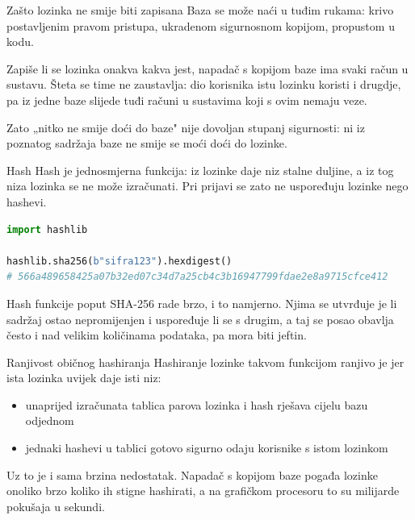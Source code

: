 
\begin{frame}{Zašto lozinka ne smije biti zapisana}
Baza se može naći u tuđim rukama: krivo postavljenim pravom pristupa, ukradenom sigurnosnom kopijom, propustom u kodu.

\vspace{1.1em}
Zapiše li se lozinka onakva kakva jest, napadač s kopijom baze ima svaki račun u sustavu. Šteta se time ne zaustavlja: dio korisnika istu lozinku koristi i drugdje, pa iz jedne baze slijede tuđi računi u sustavima koji s ovim nemaju veze.

\vspace{1.1em}
Zato „nitko ne smije doći do baze" nije dovoljan stupanj sigurnosti: ni iz poznatog sadržaja baze ne smije se moći doći do lozinke.
\end{frame}

\begin{frame}[fragile]{Hash}
Hash je jednosmjerna funkcija: iz lozinke daje niz stalne duljine, a iz tog niza lozinka se ne može izračunati. Pri prijavi se zato ne uspoređuju lozinke nego hashevi.

\begin{lstlisting}[language=python]
import hashlib

hashlib.sha256(b"sifra123").hexdigest()
# 566a489658425a07b32ed07c34d7a25cb4c3b16947799fdae2e8a9715cfce412
\end{lstlisting}

\vspace{1.1em}
Hash funkcije poput SHA-256 rade brzo, i to namjerno. Njima se utvrđuje je li sadržaj ostao nepromijenjen i uspoređuje li se s drugim, a taj se posao obavlja često i nad velikim količinama podataka, pa mora biti jeftin.
\end{frame}


\begin{frame}{Ranjivost običnog hashiranja}
Hashiranje lozinke takvom funkcijom ranjivo je jer ista lozinka uvijek daje isti niz:

\vspace{0.5em}
\begin{itemize}
  \item unaprijed izračunata tablica parova lozinka i hash rješava cijelu bazu odjednom
  \item jednaki hashevi u tablici gotovo sigurno odaju korisnike s istom lozinkom
\end{itemize}

\vspace{1.1em}
Uz to je i sama brzina nedostatak. Napadač s kopijom baze pogađa lozinke onoliko brzo koliko ih stigne hashirati, a na grafičkom procesoru to su milijarde pokušaja u sekundi.
\end{frame}

